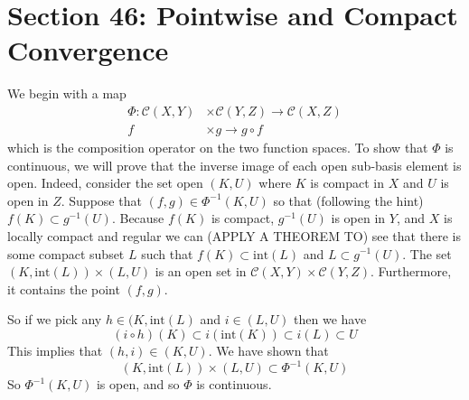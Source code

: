 \documentclass{article}
\DeclareMathOperator{\lra}{\longrightarrow}
\newcommand{\exercise}[1]{\noindent{\textbf{Exercise #1:}}}
\begin{document}
\section{Section 46: Pointwise and Compact Convergence}
\exercise{46.7}

 We begin with a map
\begin{align*}
  \Phi: \mathcal{C}(X,Y) &\times \mathcal{C}(Y,Z) \lra \mathcal{C}(X,Z) \\
  f &\times g \lra g\circ f
\end{align*}
which is the composition operator on the two function spaces. To show
that $\Phi$ is continuous, we will prove that the inverse image of
each open sub-basis element is open. Indeed, consider the set open
$(K,U)$ where $K$ is compact in $X$ and $U$ is open in $Z$. Suppose
that $(f,g) \in \Phi^{-1}(K,U)$ so that (following the hint) $f(K)
\subset g^{-1}(U)$. Because $f(K)$ is compact, $g^{-1}(U)$ is open in
$Y$, and $X$ is locally compact and regular we can (APPLY A THEOREM
TO) see that there is some compact subset $L$ such that $f(K) \subset
\text{int}(L)$ and $L \subset g^{-1}(U)$. The set $(K,\text{int}(L))
\times (L, U)$ is an open set in $\mathcal{C}(X,Y) \times
\mathcal{C}(Y,Z)$. Furthermore, it contains the point $(f,g)$.

So if we pick any $h \in (K, \text{int}(L)$ and $i \in (L, U)$ then we have
\[
(i\circ h)(K) \subset i(\text{int}(K)) \subset i(L) \subset U
\]
This implies that $(h,i) \in (K,U)$. We have shown that
\[
(K,\text{int}(L)) \times (L, U) \subset \Phi^{-1}(K,U)
\]
So $\Phi^{-1}(K,U)$ is open, and so $\Phi$ is continuous.
\end{document}
